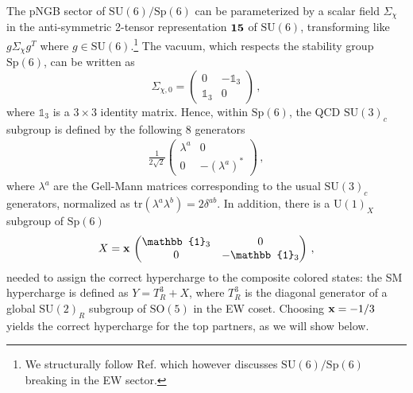 \documentclass[preprintnumbers,nofootinbib,showpacs,eqsecnum,pre,12pt]{revtex4-1}
\newcommand{\SO}{\text{SO}}
\newcommand{\SU}{\text{SU}}
\newcommand{\U}{\text{U}}
\newcommand{\Sp}{\text{Sp}}
\newcommand{\id}{\mathbb{1}}
\begin{document}
The pNGB sector of $\SU(6)/\Sp(6)$ can be parameterized by a scalar field $\Sigma_\chi$ in the anti-symmetric 2-tensor representation $\bf{15}$ of $\SU(6)$, transforming like $g \Sigma_\chi g^T$ where $g\in \SU(6)$.\footnote{We structurally follow Ref. \cite{Cheng:2020dum} which however discusses $\SU(6)/\Sp(6)$ breaking in the EW sector.}
%
The vacuum, which respects the stability group $\Sp(6)$, can be written as
\begin{equation} \label{eq:vacuumchi}
\Sigma_{\chi,0}=  \begin{pmatrix} 0 & - \id_3 \\ \id_3 & 0 \end{pmatrix}\,,
\end{equation}
where $\id_3$ is a $3\times 3$ identity matrix.
Hence, within $\Sp(6)$, the QCD $\SU(3)_c$ subgroup is defined by the following 8 generators
\begin{align}
\label{eq:SU3_embedding}
 \frac{1}{2 \sqrt{2} } \begin{pmatrix} \lambda^a & 0 \\ 0 & - (\lambda^a)^* \end{pmatrix}\,,
\end{align} 
where $\lambda^a$ are the Gell-Mann matrices corresponding to the usual $\SU(3)_c$ generators,
normalized as tr$(\lambda^a \lambda^b)= 2 \delta^{ab}$.
In addition, there is a $\U(1)_X$ subgroup of $\Sp(6)$ 
\begin{align}
X =  {\bf x} \, \begin{pmatrix} \id_3 & 0 \\ 0 & - \id_3  \end{pmatrix}\,,
\label{eq:Ygen}
\end{align}
needed to assign the correct hypercharge to the composite colored states: the SM hypercharge is defined as $Y = T^3_R + X$, where $T_R^3$ is the diagonal generator of a global $\SU(2)_R$ subgroup of $\SO(5)$ in the EW coset. 
Choosing ${\bf x}=-1/3$ yields the correct hypercharge for the top partners, as we will show below.
\end{document}
